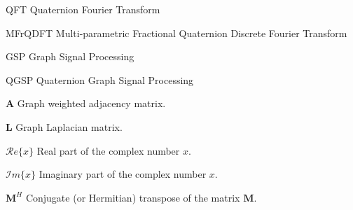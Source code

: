 \documentclass[
	11pt,				%
	openright,			%
	twoside,			%
	a4paper,			%
	french,				%
	brazil,			%
	english				%
	]{abntex2}
\newcommand{\listofquadrosname}{Lista de quadros}
\begin{document}
%

%

\listoffigures*
\cleardoublepage



\begin{siglas}
\item[QFT] Quaternion Fourier Transform
\item[MFrQDFT] Multi-parametric Fractional Quaternion Discrete Fourier Transform
\item[GSP] Graph Signal Processing
\item[QGSP] Quaternion Graph Signal Processing
\end{siglas}

\begin{simbolos}
\item[$ \mathbf{A} $] Graph weighted adjacency matrix.
\item[$ \mathbf{L} $] Graph Laplacian matrix.
\item[$\mathcal{R}e \{ x \}$] Real part of the complex number $x$.
\item[$\mathcal{I}m \{ x \}$] Imaginary part of the complex number $x$.
\item[$\mathbf{M}^H$] Conjugate (or Hermitian) transpose of the matrix $\mathbf{M}$.
\end{simbolos}
\end{document}
